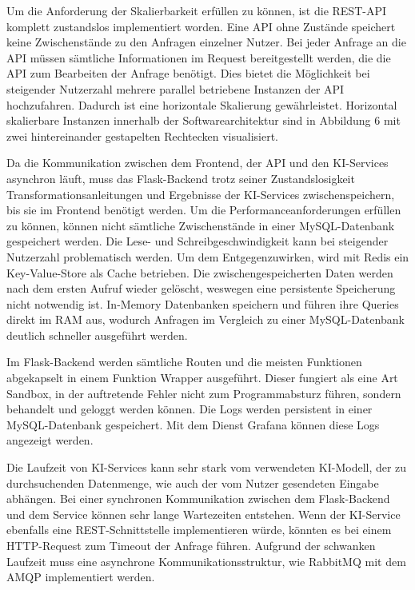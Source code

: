 Um die Anforderung der Skalierbarkeit erfüllen zu können, ist die REST-API komplett zustandslos implementiert worden. Eine API ohne Zustände speichert keine Zwischenstände zu den Anfragen einzelner Nutzer. Bei jeder Anfrage an die API müssen sämtliche Informationen im Request bereitgestellt werden, die die API zum Bearbeiten der Anfrage benötigt. Dies bietet die Möglichkeit bei steigender Nutzerzahl mehrere parallel betriebene Instanzen der API hochzufahren. Dadurch ist eine horizontale Skalierung gewährleistet. Horizontal skalierbare Instanzen innerhalb der Softwarearchitektur sind in Abbildung 6 mit zwei hintereinander gestapelten Rechtecken visualisiert.

Da die Kommunikation zwischen dem Frontend, der API und den KI-Services asynchron läuft, muss das Flask-Backend trotz seiner Zustandslosigkeit Transformationsanleitungen und Ergebnisse der KI-Services zwischenspeichern, bis sie im Frontend benötigt werden. Um die Performanceanforderungen erfüllen zu können, können nicht sämtliche Zwischenstände in einer MySQL-Datenbank gespeichert werden. Die Lese- und Schreibgeschwindigkeit kann bei steigender Nutzerzahl problematisch werden. Um dem Entgegenzuwirken, wird mit Redis ein Key-Value-Store als Cache betrieben. Die zwischengespeicherten Daten werden nach dem ersten Aufruf wieder gelöscht, weswegen eine persistente Speicherung nicht notwendig ist. In-Memory Datenbanken speichern und führen ihre Queries direkt im RAM aus, wodurch Anfragen im Vergleich zu einer MySQL-Datenbank deutlich schneller ausgeführt werden.

Im Flask-Backend werden sämtliche Routen und die meisten Funktionen abgekapselt in einem Funktion Wrapper ausgeführt. Dieser fungiert als eine Art Sandbox, in der auftretende Fehler nicht zum Programmabsturz führen, sondern behandelt und geloggt werden können. Die Logs werden persistent in einer MySQL-Datenbank gespeichert. Mit dem Dienst Grafana können diese Logs angezeigt werden.

Die Laufzeit von KI-Services kann sehr stark vom verwendeten KI-Modell, der zu durchsuchenden Datenmenge, wie auch der vom Nutzer gesendeten Eingabe abhängen. Bei einer synchronen Kommunikation zwischen dem Flask-Backend und dem Service können sehr lange Wartezeiten entstehen. Wenn der KI-Service ebenfalls eine REST-Schnittstelle implementieren würde, könnten es bei einem HTTP-Request zum Timeout der Anfrage führen. Aufgrund der schwanken Laufzeit muss eine asynchrone Kommunikationsstruktur, wie RabbitMQ mit dem AMQP implementiert werden.


